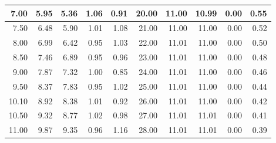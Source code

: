 \documentclass[a4paper,12pt]{article}
\begin{document}
\begin{table}[h]
{\begin{tabular}{|r|r|r|r|r|r|r|r|r|r|}
7.00                        & 5.95                        & 5.36                        & 1.06                        & 0.91
& 20.00                     & 11.00                       & 10.99                       & 0.00                        & 0.55\\ \hline
7.50                        & 6.48                        & 5.90                        & 1.01                        & 1.08
& 21.00                     & 11.00                       & 11.00                       & 0.00                        & 0.52\\ \hline
8.00                        & 6.99                        & 6.42                        & 0.95                        & 1.03
& 22.00                     & 11.01                       & 11.00                       & 0.00                        & 0.50\\ \hline
8.50                        & 7.46                        & 6.89                        & 0.95                        & 0.96
& 23.00                     & 11.01                       & 11.00                       & 0.00                        & 0.48\\ \hline
9.00                        & 7.87                        & 7.32                        & 1.00                        & 0.85
& 24.00                     & 11.01                       & 11.00                       & 0.00                        & 0.46\\ \hline
9.50                        & 8.37                        & 7.83                        & 0.95                        & 1.02
& 25.00                     & 11.01                       & 11.00                       & 0.00                        & 0.44\\ \hline
10.10                       & 8.92                        & 8.38                        & 1.01                        & 0.92
& 26.00                     & 11.01                       & 11.00                       & 0.00                        & 0.42\\ \hline
10.50                       & 9.32                        & 8.77                        & 1.02                        & 0.98
& 27.00                     & 11.01                       & 11.01                       & 0.00                        & 0.41\\ \hline
11.00                       & 9.87                        & 9.35                        & 0.96                        & 1.16
& 28.00                     & 11.01                       & 11.01                       & 0.00                        & 0.39\\ \hline

\end{tabular}}
\end{table}
\end{document}
